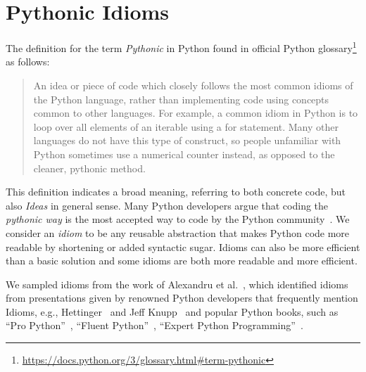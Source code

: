\section{Pythonic Idioms}
The definition for the term \emph{Pythonic} in Python found in official Python glossary\footnote{\url{https://docs.python.org/3/glossary.html\#term-pythonic}} as follows:

\begin{quote}
    An idea or piece of code which closely follows the most common idioms of the Python language, rather than implementing code using concepts common to other languages. For example, a common idiom in Python is to loop over all elements of an iterable using a for statement. Many other languages do not have this type of construct, so people unfamiliar with Python sometimes use a numerical counter instead, as opposed to the cleaner, pythonic method.
\end{quote}

This definition indicates a broad meaning, referring to both concrete code, but also \emph{Ideas} in general sense. Many Python developers argue that coding the \emph{pythonic way} is the most accepted way to code by the Python community~\cite{Alexandru2018}. We consider an \emph{idiom} to be any reusable abstraction that makes Python code more readable by shortening or added syntactic sugar. Idioms can also be more efficient than a basic solution and some idioms are both more readable and more efficient.

We sampled idioms from the work of Alexandru et al.~\cite{Alexandru2018}, which identified idioms from presentations given by renowned Python developers that frequently mention Idioms, e.g., Hettinger~\cite{hettinger} and Jeff Knupp~\cite{knupp} and popular Python books, such as ``Pro Python''~\cite{Alchin2010}, ``Fluent Python''~\cite{fluent}, ``Expert Python Programming''~\cite{expert}.


